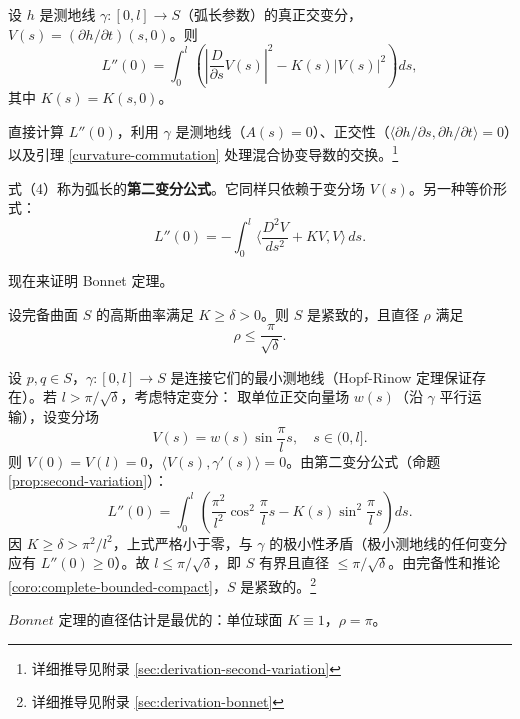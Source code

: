 \begin{Proposition}\label{prop:second-variation}
设 $h$ 是测地线 $\gamma: [0,l] \to S$（弧长参数）的真正交变分，$V(s) = (\partial h/\partial t)(s,0)$。则
\[
L''(0) = \int_0^l\left(\left|\frac{D}{\partial s}V(s)\right|^2 - K(s)|V(s)|^2\right)ds,
\]
其中 $K(s) = K(s,0)$。
\end{Proposition}

\begin{Proof}[证明概要]
直接计算 $L''(0)$，利用 $\gamma$ 是测地线（$A(s)=0$）、正交性（$\langle\partial h/\partial s, \partial h/\partial t\rangle=0$）以及引理 \ref{curvature-commutation} 处理混合协变导数的交换。\footnote{详细推导见附录 \cref{sec:derivation-second-variation}}
\end{Proof}

\begin{Remark}
式（4）称为弧长的\textbf{第二变分公式}。它同样只依赖于变分场 $V(s)$。另一种等价形式：
\[
L''(0) = -\int_0^l \langle \frac{D^2V}{ds^2} + KV, V\rangle\,ds.
\]
\end{Remark}

现在来证明 Bonnet 定理。

\begin{Theorem}[Bonnet]\label{bonnet}
设完备曲面 $S$ 的高斯曲率满足 $K \geq \delta > 0$。则 $S$ 是紧致的，且直径 $\rho$ 满足
\[
\rho \leq \frac{\pi}{\sqrt{\delta}}.
\]
\end{Theorem}

\begin{Proof}[证明概要]
设 $p,q \in S$，$\gamma: [0,l] \to S$ 是连接它们的最小测地线（Hopf-Rinow 定理保证存在）。若 $l > \pi/\sqrt{\delta}$，考虑特定变分：
取单位正交向量场 $w(s)$（沿 $\gamma$ 平行运输），设变分场
\[
V(s) = w(s)\sin\frac{\pi}{l}s,\quad s\in(0,l].
\]
则 $V(0)=V(l)=0$，$\langle V(s),\gamma'(s)\rangle=0$。由第二变分公式（命题 \ref{prop:second-variation}）：
\[
L''(0) = \int_0^l\left(\frac{\pi^2}{l^2}\cos^2\frac{\pi}{l}s - K(s)\sin^2\frac{\pi}{l}s\right)ds.
\]
因 $K \geq \delta > \pi^2/l^2$，上式严格小于零，与 $\gamma$ 的极小性矛盾（极小测地线的任何变分应有 $L''(0) \geq 0$）。故 $l \leq \pi/\sqrt{\delta}$，即 $S$ 有界且直径 $\leq \pi/\sqrt{\delta}$。由完备性和推论 \ref{coro:complete-bounded-compact}，$S$ 是紧致的。\footnote{详细推导见附录 \cref{sec:derivation-bonnet}}
\end{Proof}

\begin{Remark}
$Bonnet$ 定理的直径估计是最优的：单位球面 $K\equiv 1$，$\rho = \pi$。
\end{Remark}

